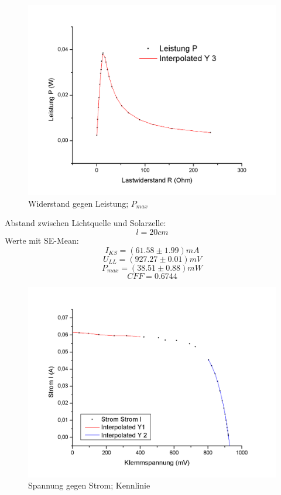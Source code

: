 \documentclass[12pt,a4paper]{article}
\begin{document}
\begin{figure}[H]
	\centering
	\includegraphics[scale=0.6]{./figure/solarzelle_pmax.png}
	\caption{Widerstand gegen Leistung; $P_{max}$}
	\label{fig:solarzelle_leistung}
\end{figure}
\begin{multicols}{2}
\noindent
Abstand zwischen Lichtquelle und Solarzelle:
$$l = 20cm$$
Werte mit SE-Mean:
$$I_{KS} = (61.58 \pm 1.99) mA$$
$$U_{LL} = (927.27 \pm 0.01) mV$$
$$P_{max} = (38.51 \pm 0.88) mW$$
$$CFF = 0.6744$$

\end{multicols}
\begin{figure}[H]
	\centering
	\includegraphics[scale=0.6]{./figure/solarzelle_strom_spannung.png}
	\caption{Spannung gegen Strom; Kennlinie}
	\label{fig:solarzelle_strom_spannung}
\end{figure}
\end{document}
